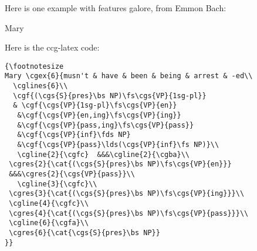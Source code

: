\documentclass[11pt]{article}
\begin{document}
Here is one example with features galore, from Emmon Bach:\bigskip

{\footnotesize
Mary }\bigskip

Here is the ccg-latex code:\bigskip
\begin{verbatim}
{\footnotesize
Mary \cgex{6}{musn't & have & been & being & arrest & -ed\\
  \cglines{6}\\
  \cgf{(\cgs{S}{pres}\bs NP)\fs\cgs{VP}{1sg-pl}}
  & \cgf{\cgs{VP}{1sg-pl}\fs\cgs{VP}{en}}
   &\cgf{\cgs{VP}{en,ing}\fs\cgs{VP}{ing}}
   &\cgf{\cgs{VP}{pass,ing}\fs\cgs{VP}{pass}}
   &\cgf{\cgs{VP}{inf}\fds NP}
   &\cgf{\cgs{VP}{pass}\lds(\cgs{VP}{inf}\fs NP)}\\
   \cgline{2}{\cgfc}  &&&\cgline{2}{\cgba}\\
 \cgres{2}{\cat{(\cgs{S}{pres}\bs NP)\fs\cgs{VP}{en}}} 
 &&&\cgres{2}{\cgs{VP}{pass}}\\
   \cgline{3}{\cgfc}\\
 \cgres{3}{\cat{(\cgs{S}{pres}\bs NP)\fs\cgs{VP}{ing}}}\\
 \cgline{4}{\cgfc}\\
 \cgres{4}{\cat{(\cgs{S}{pres}\bs NP)\fs\cgs{VP}{pass}}}\\
 \cgline{6}{\cgfa}\\
 \cgres{6}{\cat{\cgs{S}{pres}\bs NP}}
}}
\end{verbatim}

\newpage
\end{document}
